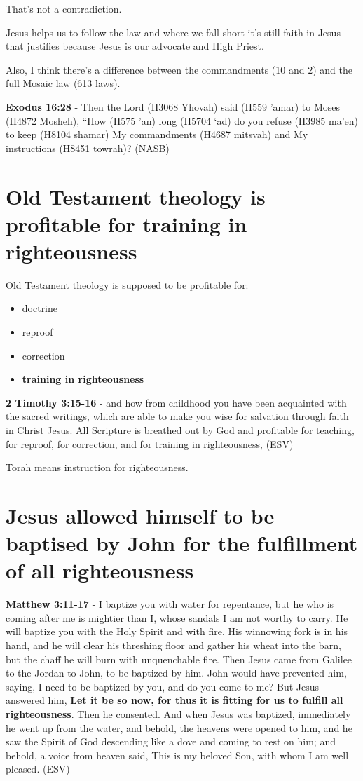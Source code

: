 \documentclass[11pt]{article}
\begin{document}
That's not a contradiction.

Jesus helps us to follow the law and where we fall short it's still faith in Jesus that justifies because Jesus is our advocate and High Priest.

Also, I think there's a difference between the commandments (10 and 2) and the full Mosaic law (613 laws).

\textbf{Exodus 16:28} - Then the Lord (H3068 Yhovah) said (H559 'amar) to Moses (H4872 Mosheh), “How (H575 'an) long (H5704 `ad) do you refuse (H3985 ma'en) to keep (H8104 shamar) My commandments (H4687 mitsvah) and My instructions (H8451 towrah)? (NASB)

\section{Old Testament theology is profitable for training in righteousness}
\label{sec:orgb22f5e4}
Old Testament theology is supposed to be profitable for:
\begin{itemize}
\item doctrine
\item reproof
\item correction
\item \textbf{training in righteousness}
\end{itemize}

\textbf{2 Timothy 3:15-16} -  and how from childhood you have been acquainted with the sacred writings, which are able to make you wise for salvation through faith in Christ Jesus.  All Scripture is breathed out by God and profitable for teaching, for reproof, for correction, and for training in righteousness,  (ESV)

Torah means instruction for righteousness.

\section{Jesus allowed himself to be baptised by John for the fulfillment of all righteousness}
\label{sec:org2647dcc}
\textbf{Matthew 3:11-17} - I baptize you with water for repentance, but he who is coming after me is mightier than I, whose sandals I am not worthy to carry. He will baptize you with the Holy Spirit and with fire.  His winnowing fork is in his hand, and he will clear his threshing floor and gather his wheat into the barn, but the chaff he will burn with unquenchable fire.  Then Jesus came from Galilee to the Jordan to John, to be baptized by him.  John would have prevented him, saying, I need to be baptized by you, and do you come to me?  But Jesus answered him, \textbf{Let it be so now, for thus it is fitting for us to fulfill all righteousness}. Then he consented.  And when Jesus was baptized, immediately he went up from the water, and behold, the heavens were opened to him, and he saw the Spirit of God descending like a dove and coming to rest on him; and behold, a voice from heaven said, This is my beloved Son, with whom I am well pleased. (ESV)
\end{document}
